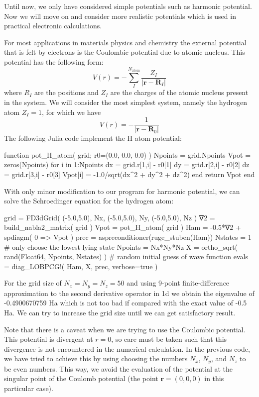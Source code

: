 Until now, we only have considered simple potentials such as harmonic potential. Now we will
move on and consider more realistic potentials which is used in practical electronic calculations.

For most applications in materials physics and chemistry the external potential that is
felt by electrons is the Coulombic potential due to atomic nucleus. This potential has
the following form:
\begin{equation}
V(r) = -\sum_{I}^{N_{\mathrm{atom}}} \frac{Z_{I}}{\left|\mathbf{r} - \mathbf{R}_{I}\right|}
\end{equation}
where $R_{I}$ are the positions and $Z_{I}$ are the charges
of the atomic nucleus present in the system.
%
We will consider the most simplest system, namely the hydrogen atom $Z_{I}=1$, for which we have
\begin{equation}
V(r) = -\frac{1}{\left|\mathbf{r} - \mathbf{R}_{0}\right|}
\end{equation}
%
The following Julia code implement the H atom potential:
\begin{juliacode}
function pot_H_atom( grid; r0=(0.0, 0.0, 0.0) )
  Npoints = grid.Npoints
  Vpot = zeros(Npoints)
  for i in 1:Npoints
    dx = grid.r[1,i] - r0[1]
    dy = grid.r[2,i] - r0[2]
    dz = grid.r[3,i] - r0[3]
    Vpot[i] = -1.0/sqrt(dx^2 + dy^2 + dz^2)
  end
  return Vpot
end
\end{juliacode}

With only minor modification to our program for harmonic potential, we can solve the Schroedinger
equation for the hydrogen atom:
\begin{juliacode}
grid = FD3dGrid( (-5.0,5.0), Nx, (-5.0,5.0), Ny, (-5.0,5.0), Nz )
∇2 = build_nabla2_matrix( grid )
Vpot = pot_H_atom( grid )
Ham = -0.5*∇2 + spdiagm( 0 => Vpot )
prec = aspreconditioner(ruge_stuben(Ham))
Nstates = 1  # only choose the lowest lying state
Npoints = Nx*Ny*Nz
X = ortho_sqrt( rand(Float64, Npoints, Nstates) ) # random initial guess of wave function
evals = diag_LOBPCG!( Ham, X, prec, verbose=true )
\end{juliacode}

For the grid size of $N_{x}=N_{y}=N_{z}=50$ and using 9-point finite-difference approximation
to the second derivative operator in 1d we obtain the eigenvalue of -0.4900670759 Ha which
is not too bad if compared with the exact value of -0.5 Ha. We can try to increase the grid
size until we can get satisfactory result.

Note that there is a caveat when we are trying to use the Coulombic potential. This potential
is divergent at $r=0$, so care must be taken such that this divergence is not encountered in
the numerical calculation. In the previous code, we have tried to achieve this by using
choosing the numbers
$N_{x}$, $N_{y}$, and $N_{z}$ to be even numbers. This way, we avoid the evaluation of
the potential at the singular point of the Coulomb potential
(the point $\mathbf{r} = (0,0,0)$ in this
particular case).

